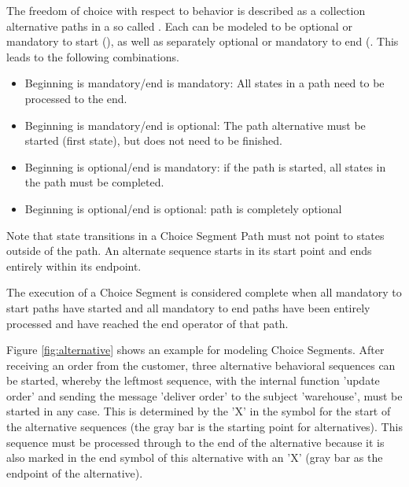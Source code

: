The freedom of choice with respect to behavior is described as a collection alternative paths in a so called . Each  can be modeled to be optional or mandatory to start (), as well as separately optional or mandatory to end (. This leads to the following combinations.

\begin{itemize}
	\item Beginning is mandatory/end is mandatory: All states in a path need to be processed to the end.
	\item Beginning is mandatory/end is optional: The path alternative must be started (first state), but does not need to be finished. 
	\item Beginning is optional/end is mandatory: if the path is started, all states in the path must be completed.
	\item Beginning is optional/end is optional: path is completely optional
\end{itemize}

Note that state transitions in a Choice Segment Path must not point to states outside of the path. An alternate sequence starts in its start point and ends entirely within its endpoint.

The execution of a Choice Segment is considered complete when all mandatory to start paths have started and all mandatory to end paths have been entirely processed and have reached the end operator of that path.

Figure \ref{fig:alternative} shows an example for modeling Choice Segments. After receiving an order from the customer, three alternative behavioral sequences can be started, whereby the leftmost sequence, with the internal function 'update order' and sending the message 'deliver order' to the subject 'warehouse', must be started in any case. This is determined by the 'X' in the symbol for the start of the alternative sequences (the gray bar is the starting point for alternatives). This sequence must be processed through to the end of the alternative because it is also marked in the end symbol of this alternative with an 'X' (gray bar as the endpoint of the alternative).


